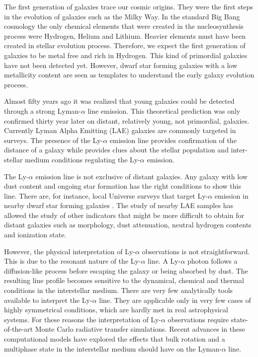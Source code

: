 \documentclass[a4paper, usenatbib, 12pt]{article}
\begin{document}
{The first generation of galaxies trace our cosmic origins. 
They were the first steps in the evolution of galaxies such as the Milky
Way. 
In the standard Big Bang cosmology the only chemical elements that
were created in the nucleosynthesis process were Hydrogen, Helium and
Lithium.  
Heavier elements must have been created in stellar evolution process. 
Therefore, we expect the first generation of
galaxies to be metal free and rich in Hydrogen. 
This kind of primordial galaxies have not been detected yet. 
However, dwarf star forming galaxies with a low metallicity content
are seen as templates to understand the early galaxy evolution process. 

Almost fifty years ago \cite{PartridgePeebles} it was realized that
young galaxies could be detected through a strong Lyman-$\alpha$ line
emission.  
This theoretical prediction was only confirmed thirty year later on
distant, relatively young, not primordial, galaxies.
Currently Lyman Alpha Emitting (LAE) galaxies are commonly targeted
in surveys. 
The presence of the Ly-$\alpha$ emission line provides confirmation of
the distance of a galaxy while provides clues about the stellar
population and inter-stellar medium conditions regulating the
Ly-$\alpha$ emission. 

The Ly-$\alpha$ emission line is not exclusive of distant galaxies. 
Any galaxy with low dust content and ongoing star formation has the
right conditions to show this line.  
There are, for instance,  local Universe surveys that target
Ly-$\alpha$ emission in nearby dwarf star forming galaxies 
\cite{LARS}. 
The study of nearby LAE samples has allowed the study of other
indicators that might be more difficult to obtain for distant galaxies
such as morphology, dust attenuation, neutral hydrogen contents and
ionization state.  

However, the physical interpretation of Ly-$\alpha$ observations is
not straightforward. 
This is due to the resonant nature of the Ly-$\alpha$ line. 
A Ly-$\alpha$ photon follows a diffusion-like process before escaping
the galaxy or being absorbed by dust. 
The resulting line profile becomes sensitive to the dynamical, chemical
and thermal conditions in the interstellar medium. 
There are very few analytically tools available to interpret the
Ly-$\alpha$ line.
They are applicable only in very few cases of highly symmetrical
conditions, which are hardly met in real astrophysical systems.
For these reasons the interpretation of Ly-$\alpha$ observations
require state-of-the-art Monte Carlo radiative transfer simulations.   
Recent advances in these computational models have explored the
effects that bulk rotation and a multiphase state in the interstellar
medium should have on the Lyman-$\alpha$ line.

}
\end{document}
